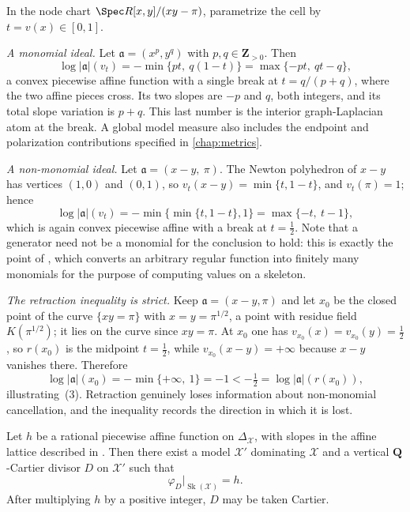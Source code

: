 \begin{example}
\label{ex:vertical-ideal-segment}
\leavevmode\par\noindent
In the node chart $\Spec R[x,y]/(xy-\pi)$, parametrize the cell by
$t=v(x)\in[0,1]$.

\emph{A monomial ideal.} Let $\mathfrak a=(x^p,y^q)$ with
$p,q\in\mathbf Z_{>0}$. Then
\[
 \log|\mathfrak a|(v_t)=-\min\{pt,\ q(1-t)\}
 =\max\{-pt,\ qt-q\},
\]
a convex piecewise affine function with a single break at
$t=q/(p+q)$, where the two affine pieces cross. Its two slopes are $-p$
and $q$, both integers, and its total slope variation is $p+q$. This
last number is the interior graph-Laplacian atom at the break. A global
model measure also includes the endpoint and polarization contributions
specified in \cref{chap:metrics}.

\emph{A non-monomial ideal.} Let $\mathfrak a=(x-y,\ \pi)$. The Newton
polyhedron of $x-y$ has vertices $(1,0)$ and $(0,1)$, so
$v_t(x-y)=\min\{t,1-t\}$, and $v_t(\pi)=1$; hence
\[
 \log|\mathfrak a|(v_t)=-\min\{\min\{t,1-t\},1\}
 =\max\{-t,\ t-1\},
\]
which is again convex piecewise affine with a break at $t=\tfrac12$. Note
that a generator need not be a monomial for the conclusion to hold: this is
exactly the point of , which converts an arbitrary
regular function into finitely many monomials for the purpose of computing
values on a skeleton.

\emph{The retraction inequality is strict.} Keep
$\mathfrak a=(x-y,\pi)$ and let $x_0$ be the closed point of the curve
$\{xy=\pi\}$ with $x=y=\pi^{1/2}$, a point with residue field
$K(\pi^{1/2})$; it lies on the curve since $xy=\pi$. At $x_0$ one has
$v_{x_0}(x)=v_{x_0}(y)=\tfrac12$, so $r(x_0)$ is the midpoint
$t=\tfrac12$, while $v_{x_0}(x-y)=+\infty$ because $x-y$ vanishes
there. Therefore
\[
 \log|\mathfrak a|(x_0)=-\min\{+\infty,\ 1\}=-1
 <-\tfrac12=\log|\mathfrak a|(r(x_0)),
\]
illustrating \,(3). Retraction genuinely
loses information about non-monomial cancellation, and the inequality
records the direction in which it is lost.
\end{example}

\begin{theorem}\label{thm:skeleton-pl-realization}
Let $h$ be a rational piecewise affine function on
$\Delta_{\mathcal X}$, with slopes in the affine lattice described in
. Then there exist a model
$\mathcal X'$ dominating $\mathcal X$ and a vertical
$\mathbf Q$-Cartier divisor $D$ on $\mathcal X'$ such that
\[
                    \varphi_D|_{\operatorname{Sk}(\mathcal X)}=h.
\]
After multiplying $h$ by a positive integer, $D$ may be taken Cartier.
\end{theorem}


